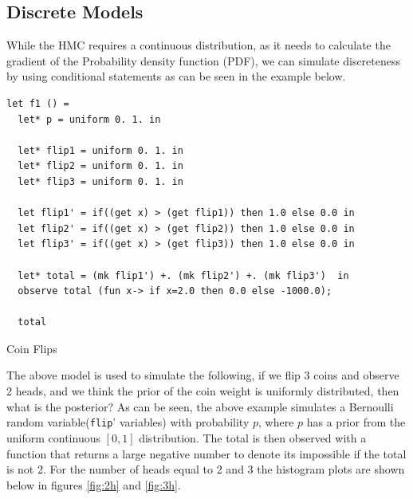 \documentclass[a4paper,11pt]{article}
\theoremstyle{mytheor}
\begin{document}
    \subsection{Discrete Models}
    
    While the HMC requires a continuous distribution, as it needs to calculate the gradient of the Probability density function (PDF), we can simulate discreteness by using conditional statements as can be seen in the example below.
    
\begin{listing}[H]\centering
\begin{verbatim}
let f1 () =
  let* p = uniform 0. 1. in 

  let* flip1 = uniform 0. 1. in 
  let* flip2 = uniform 0. 1. in 
  let* flip3 = uniform 0. 1. in 

  let flip1' = if((get x) > (get flip1)) then 1.0 else 0.0 in 
  let flip2' = if((get x) > (get flip2)) then 1.0 else 0.0 in 
  let flip3' = if((get x) > (get flip3)) then 1.0 else 0.0 in 

  let* total = (mk flip1') +. (mk flip2') +. (mk flip3')  in 
  observe total (fun x-> if x=2.0 then 0.0 else -1000.0);

  total
\end{verbatim}
\caption{Coin Flips}
\end{listing}

    The above model is used to simulate the following, if we flip 3 coins and observe 2 heads, and we think the prior of the coin weight is uniformly distributed, then what is the posterior? As can be seen, the above example simulates a Bernoulli random variable(\lstinline{flip}' variables) with probability $p$, where $p$ has a prior from the uniform continuous $[0,1]$ distribution. The total is then observed with a function that returns a large negative number to denote its impossible if the total is not 2. For the number of heads equal to 2 and 3 the histogram plots are shown below in figures \ref{fig:2h} and \ref{fig:3h}.
    
\end{document}
